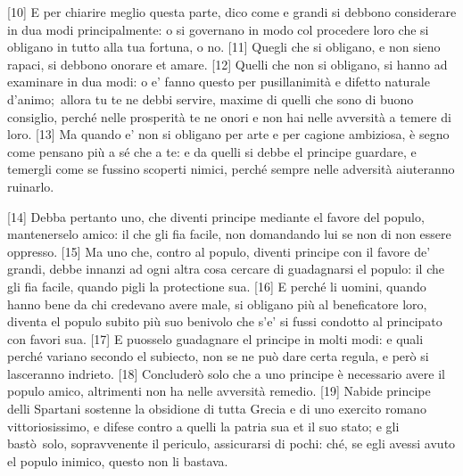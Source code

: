 {[}10{]} E per chiarire meglio questa parte, dico come e grandi si
debbono considerare in dua modi principalmente: o si governano in modo
col procedere loro che si obligano in tutto alla tua fortuna, o no.
{[}11{]} Quegli che si obligano, e non sieno rapaci, si debbono onorare
et amare. {[}12{]} Quelli che non si obligano, si hanno ad examinare in
dua modi: o e' fanno questo per pusillanimità e difetto naturale
d'animo;\est\ allora tu te ne debbi servire, maxime di quelli che sono di
buono consiglio, perché nelle prosperità te ne onori e non hai nelle
avversità a temere di loro. {[}13{]} Ma quando e' non si obligano per
arte e per cagione ambiziosa, è segno come pensano più a sé che a te: e
da quelli si debbe el principe guardare, e temergli come se fussino
scoperti nimici, perché sempre nelle adversità aiuteranno ruinarlo.

{[}14{]} Debba pertanto uno, che diventi principe mediante el favore del
populo, mantenerselo amico: il che gli fia facile, non domandando lui se
non di non essere oppresso. {[}15{]} Ma uno che, contro al populo,
diventi principe con il favore de' grandi, debbe innanzi ad ogni altra
cosa cercare di guadagnarsi el populo: il che gli fia facile, quando
pigli la protectione sua. {[}16{]} E perché li uomini, quando hanno bene
da chi credevano avere male, si obligano più al beneficatore loro,
diventa el populo subito più suo benivolo che s'e' si fussi condotto al
principato con favori sua. {[}17{]} E puosselo guadagnare el principe in
molti modi: e quali perché variano secondo el subiecto, non se ne può
dare certa regula, e però si lasceranno indrieto. {[}18{]} Concluderò
solo che a uno principe è necessario avere il populo amico, altrimenti
non ha nelle avversità remedio. {[}19{]} Nabide principe delli Spartani
sostenne la obsidione di tutta Grecia e di uno exercito romano
vittoriosissimo, e difese contro a quelli la patria sua et il suo stato;
e gli bastò\est\ solo, sopravvenente il periculo, assicurarsi di pochi: ché,
se egli avessi avuto el populo inimico, questo non li bastava.

